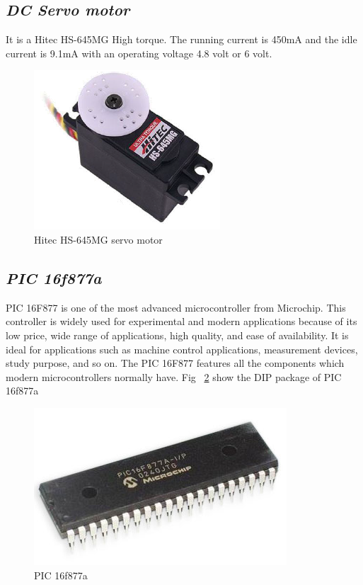 \documentclass{report}
\begin{document}
\subsection*{\emph{DC Servo motor}}
It is a Hitec HS-645MG High torque. The running current is 450mA and the idle current is 9.1mA with an operating voltage 4.8 volt or 6 volt.
\begin{figure}[h!]
\centering
\includegraphics[scale=0.5]{fig31}
\caption{Hitec HS-645MG servo motor}
\label{fig21}
\end{figure}
\subsection*{\emph{PIC 16f877a}}
PIC 16F877 is one of the most advanced microcontroller from Microchip. This controller is widely used for experimental and modern applications because of its low price, wide range of applications, high quality, and ease of availability. It is ideal for applications such as machine control applications, measurement devices, study purpose, and so on.  The PIC 16F877 features all the components which modern microcontrollers normally have. Fig ~\ref{fig22} show the DIP package of PIC 16f877a
\begin{figure}[h!]
\centering
\includegraphics[scale=0.5]{fig32}
\caption{PIC 16f877a}
\label{fig22}
\end{figure} 
\end{document}
